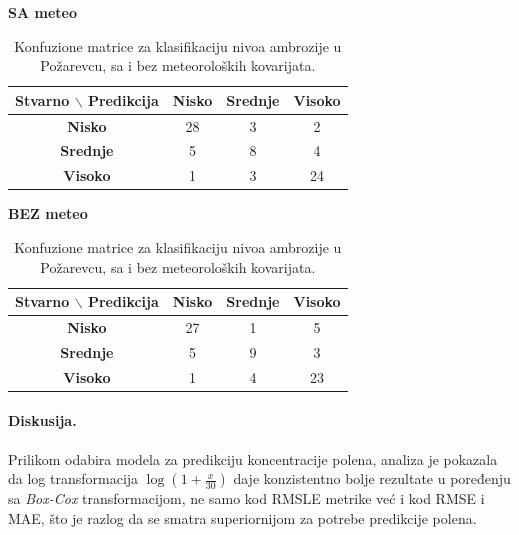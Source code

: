 \documentclass[12pt]{article}
\begin{document}
\begin{table}[H]
\centering
\caption{Konfuzione matrice za klasifikaciju nivoa ambrozije u Požarevcu, sa i bez meteoroloških kovarijata.}
\label{tab:cm_with_without}
\renewcommand{\arraystretch}{1.3}

\begin{center}
\begin{minipage}{0.45\textwidth}
\centering
\textbf{SA meteo} \\[2mm]
\begin{tabular}{|c|c|c|c|}
\hline
\textbf{Stvarno $\backslash$ Predikcija} & \textbf{Nisko} & \textbf{Srednje} & \textbf{Visoko} \\
\hline
\textbf{Nisko}   &  28  &  3  &  2  \\
\hline
\textbf{Srednje} &  5  &  8  &  4  \\
\hline
\textbf{Visoko}  &  1  &  3  &  24  \\
\hline
\end{tabular}
\end{minipage}
\hfill
\begin{minipage}{0.45\textwidth}
\centering
\textbf{BEZ meteo} \\[2mm]
\begin{tabular}{|c|c|c|c|}
\hline
\textbf{Stvarno $\backslash$ Predikcija} & \textbf{Nisko} & \textbf{Srednje} & \textbf{Visoko} \\
\hline
\textbf{Nisko}   &  27  &  1  &  5  \\
\hline
\textbf{Srednje} &  5  &  9  &  3  \\
\hline
\textbf{Visoko}  &  1  &  4  &  23  \\
\hline
\end{tabular}
\end{minipage}
\end{center}

\end{table}




\paragraph{\textbf{Diskusija.}}  

Prilikom odabira modela za predikciju koncentracije polena, analiza je pokazala da log transformacija \(\log(1 + \frac{x}{30})\) daje konzistentno bolje rezultate u poređenju sa \textit{Box-Cox} transformacijom, ne samo kod RMSLE metrike već i kod RMSE i MAE, što je razlog da se smatra superiornijom za potrebe predikcije polena.  
\end{document}
